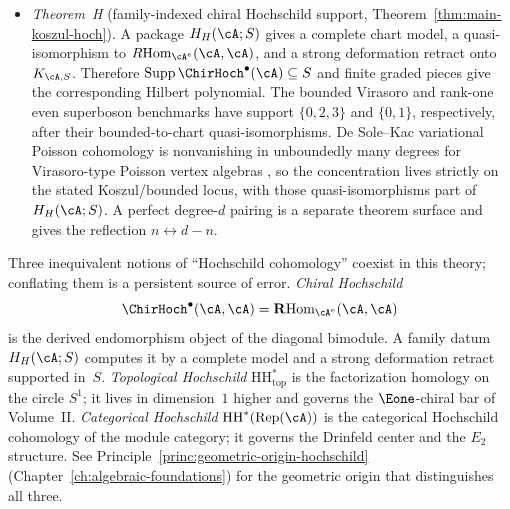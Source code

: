 \begin{itemize}
 \emph{Theorem~D$_\Delta$} (Spectral characteristic,
 Theorem~\ref{thm:spectral-characteristic}):
 the spectral discriminant $\Delta_\cA(x)$ is a separately proved
 non-scalar invariant.

 The typed characteristic \(\kappa(\cA)\) is the scalar one-loop
 coefficient of the effective action;
 its vanishing removes the scalar genus-$1$ anomaly, while
 higher-genus multi-weight corrections are a separate issue.
 Together, $D_{\mathrm{scal}}$ and $D_\Delta$ are the
 characteristic classes of the factorization homology
 bundle $\int_{\Sigma_g}\!\cA$
 (Remark~\ref{rem:four-levels}); the bundle
 itself (its fibers, flat connection, and modular
 functor structure) is the full modular homotopy invariant
 (Conjecture~\ref{conj:categorical-modular-kd}).

\item \emph{Theorem~H} (family-indexed chiral Hochschild support,
 Theorem~\ref{thm:main-koszul-hoch}).
 A package $H_H(\cA;S)$ gives a complete chart model, a
 quasi-isomorphism to $R\!\operatorname{Hom}_{\cA^e}(\cA,\cA)$, and
 a strong deformation retract onto $K_{\cA,S}$.  Therefore
 $\operatorname{Supp}\ChirHoch^\bullet(\cA)\subseteq S$ and finite
 graded pieces give the corresponding Hilbert polynomial.  The
 bounded Virasoro and rank-one even superboson benchmarks have support
 $\{0,2,3\}$ and $\{0,1\}$, respectively, after their
 bounded-to-chart quasi-isomorphisms.  De Sole--Kac variational
 Poisson cohomology is nonvanishing in unboundedly many degrees for
 Virasoro-type Poisson vertex algebras \cite{BDSK21}, so the
 concentration lives strictly on the stated Koszul/bounded locus,
 with those quasi-isomorphisms part of $H_H(\cA;S)$.  A perfect
 degree-$d$ pairing is
 a separate theorem surface and gives the reflection
 $n\leftrightarrow d-n$.
\end{itemize}

\begin{warning}
\label{warn:three-hochschild-intro}
%
Three inequivalent notions of ``Hochschild cohomology'' coexist
in this theory; conflating them is a persistent source of
error.
\emph{Chiral Hochschild}
\[
\ChirHoch^\bullet(\cA,\cA)
=
\mathbf R\!\operatorname{Hom}_{\cA^e}(\cA,\cA)
\]
is the derived endomorphism object of the diagonal bimodule.  A family
datum $H_H(\cA;S)$ computes it by a complete model and a strong
deformation retract supported in~$S$.
\emph{Topological Hochschild} $\mathrm{HH}^*_{\mathrm{top}}$
is the factorization homology on the circle $S^1$; it lives
in dimension~$1$ higher and governs the $\Eone$-chiral bar of
Volume~II.
\emph{Categorical Hochschild} $\mathrm{HH}^*(\mathrm{Rep}(\cA))$
is the categorical Hochschild cohomology of the module category; it governs
the Drinfeld center and the $E_2$ structure.
See Principle~\ref{princ:geometric-origin-hochschild}
(Chapter~\ref{ch:algebraic-foundations}) for the geometric
origin that distinguishes all three.
\end{warning}

